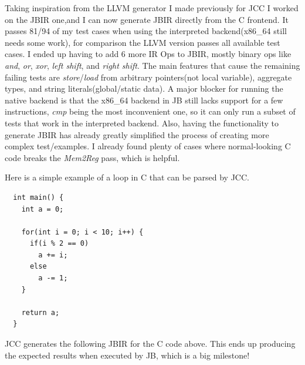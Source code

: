 \documentclass[11pt, a4paper, titlepage]{article}
\begin{document}
Taking inspiration from the LLVM generator I made previously for JCC I worked on the JBIR one,and I can now generate JBIR directly from the C frontend.
It passes 81/94 of my test cases when using the interpreted backend(x86\_64 still needs some work), 
for comparison the LLVM version passes all available test cases.
I ended up having to add 6 more IR Ops to JBIR, mostly binary ops like \textit{and}, \textit{or}, \textit{xor}, \textit{left shift}, and \textit{right shift}.
The main features that cause the remaining failing tests are \textit{store}/\textit{load} from arbitrary pointers(not local variable),
aggregate types, and string literals(global/static data).
A major blocker for running the native backend is that the x86\_64 backend in JB still lacks support for a few instructions,
\textit{cmp} being the most inconvenient one, so it can only run a subset of tests that work in the interpreted backend.
Also, having the functionality to generate JBIR has already greatly simplified the process of creating more complex test/examples.
I already found plenty of cases where normal-looking C code breaks the \textit{Mem2Reg} pass, which is helpful.

Here is a simple example of a loop in C that can be parsed by JCC.

\begin{lstlisting}
  int main() {
    int a = 0;
  
    for(int i = 0; i < 10; i++) {
      if(i % 2 == 0)
        a += i;
      else
        a -= 1;
    }
  
    return a;
  }
\end{lstlisting}

JCC generates the following JBIR for the C code above.
This ends up producing the expected results when executed by JB, which is a big milestone!
\end{document}

